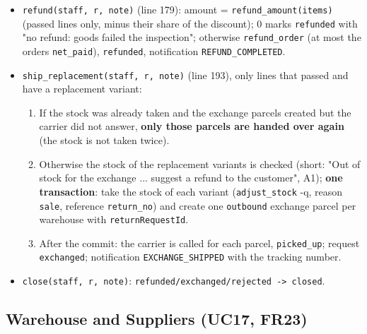 \begin{itemize}
\tightlist
\item
  \texttt{refund(\allowbreak{}staff,\allowbreak{} r,\allowbreak{} note)} (line 179): amount =
  \texttt{refund\_\allowbreak{}amount(\allowbreak{}items)} (passed lines only, minus their share
  of the discount); 0 marks \texttt{refunded} with "no refund: goods
  failed the inspection"; otherwise \texttt{refund\_\allowbreak{}order} (at most the
  order\textquotesingle s \texttt{net\_\allowbreak{}paid}), \texttt{refunded},
  notification \texttt{REFUND\_\allowbreak{}COMPLETED}.
\item
  \texttt{ship\_\allowbreak{}replacement(\allowbreak{}staff,\allowbreak{} r,\allowbreak{} note)} (line 193), only lines
  that passed and have a replacement variant:

  \begin{enumerate}
  \def\labelenumi{\arabic{enumi}.}
  \tightlist
  \item
    If the stock was already taken and the exchange parcels created but
    the carrier did not answer, \textbf{only those parcels are handed
    over again} (the stock is not taken twice).
  \item
    Otherwise the stock of the replacement variants is checked (short:
    "Out of stock for the exchange ... suggest a refund to the
    customer", A1); \textbf{one transaction}: take the stock of each
    variant (\texttt{adjust\_\allowbreak{}stock} -q, reason \texttt{sale}, reference
    \texttt{return\_\allowbreak{}no}) and create one \texttt{outbound} exchange
    parcel per warehouse with \texttt{returnRequestId}.
  \item
    After the commit: the carrier is called for each parcel,
    \texttt{picked\_\allowbreak{}up}; request \texttt{exchanged}; notification
    \texttt{EXCHANGE\_\allowbreak{}SHIPPED} with the tracking number.
  \end{enumerate}
\item
  \texttt{close(\allowbreak{}staff,\allowbreak{} r,\allowbreak{} note)}:
  \texttt{refunded/\allowbreak{}exchanged/\allowbreak{}rejected -\textgreater{}\allowbreak{} closed}.
\end{itemize}

\hypertarget{flow-inventory}{%
\subsection{Warehouse and Suppliers (UC17, FR23)}\label{flow-inventory}}

